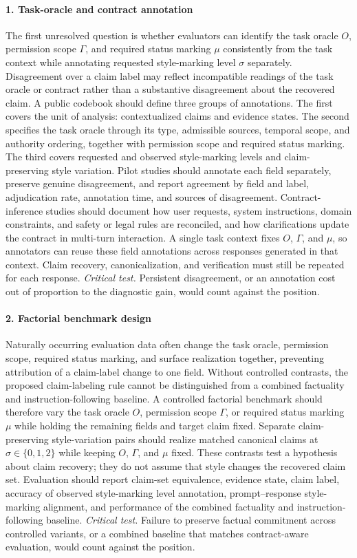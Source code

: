 \documentclass{clv2025}
\begin{document}
\paragraph{1. Task-oracle and contract annotation}
The first unresolved question is whether evaluators can identify the task
oracle $O$, permission scope $\Gamma$, and required status marking $\mu$
consistently from the task context while annotating requested style-marking
level $\sigma$ separately.
Disagreement over a claim label may reflect incompatible readings of the task
oracle or contract rather than a substantive disagreement about the recovered
claim.
A public codebook should define three groups of annotations. The first covers
the unit of analysis: contextualized claims and evidence states. The second
specifies the task oracle through its type, admissible sources, temporal scope,
and authority ordering, together with permission scope and required status
marking. The third covers requested and observed style-marking levels and
claim-preserving style variation.
Pilot studies should annotate each field separately, preserve genuine
disagreement, and report agreement by field and label, adjudication rate,
annotation time, and sources of disagreement.
Contract-inference studies should document how user requests, system
instructions, domain constraints, and safety or legal rules are reconciled,
and how clarifications update the contract in multi-turn interaction.
A single task context fixes $O$, $\Gamma$, and $\mu$, so annotators can reuse
these field annotations across responses generated in that context. Claim
recovery, canonicalization, and verification must still be repeated for each
response.
\emph{Critical test.} Persistent disagreement, or an annotation cost out of
proportion to the diagnostic gain, would count against the position.

\paragraph{2. Factorial benchmark design}
Naturally occurring evaluation data often change the task oracle, permission
scope, required status marking, and surface realization together, preventing
attribution of a claim-label change to one field.
Without controlled contrasts, the proposed claim-labeling rule cannot be
distinguished from a combined factuality and instruction-following baseline.
A controlled factorial benchmark should therefore vary the task oracle
$O$, permission scope $\Gamma$, or required status marking $\mu$ while
holding the remaining fields and target claim fixed.
Separate claim-preserving style-variation pairs should realize matched
canonical claims at $\sigma\in\{0,1,2\}$ while keeping $O$, $\Gamma$, and
$\mu$ fixed.
These contrasts test a hypothesis about claim recovery; they do not assume
that style changes the recovered claim set.
Evaluation should report claim-set equivalence, evidence state, claim label,
accuracy of observed style-marking level annotation, prompt--response
style-marking alignment, and performance of the combined factuality and
instruction-following baseline.
\emph{Critical test.} Failure to preserve factual commitment across controlled
variants, or a combined baseline that matches contract-aware evaluation, would
count against the position.
\end{document}
